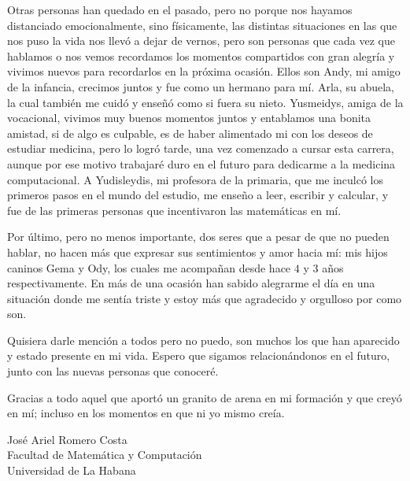 \begin{acknowledgements}
	Otras personas han quedado en el pasado, pero no porque nos hayamos distanciado emocionalmente, sino físicamente, las distintas situaciones en las que nos puso la vida nos llevó a dejar de vernos, pero son personas que cada vez que hablamos o nos vemos recordamos los momentos compartidos con gran alegría y vivimos nuevos para recordarlos en la próxima ocasión. Ellos son Andy, mi amigo de la infancia, crecimos juntos y fue como un hermano para mí. Arla, su abuela, la cual también me cuidó y enseñó como si fuera su nieto. Yusmeidys, amiga de la vocacional, vivimos muy buenos momentos juntos y entablamos una bonita amistad, si de algo es culpable, es de haber alimentado mi  con los deseos de estudiar medicina, pero lo logró tarde, una vez comenzado a cursar esta carrera, aunque por ese motivo trabajaré duro en el futuro para dedicarme a la medicina computacional. A Yudisleydis, mi profesora de la primaria, que me inculcó los primeros pasos en el mundo del estudio, me enseño a leer, escribir y calcular, y fue de las primeras personas que incentivaron las matemáticas en mí.
	
	Por último, pero no menos importante, dos seres que a pesar de que no pueden hablar, no hacen más que expresar sus sentimientos y amor hacia mí: mis hijos caninos Gema y Ody, los cuales me acompañan desde hace $4$ y $3$ años respectivamente. En más de una ocasión han sabido alegrarme el día en una situación donde me sentía triste y estoy más que agradecido y orgulloso por como son.
	
	Quisiera darle mención a todos pero no puedo, son muchos los que han aparecido y estado presente en mi vida. Espero que sigamos relacionándonos en el futuro, junto con las nuevas personas que conoceré.
	
	\begin{phrase}[3in]
		Gracias a todo aquel que aportó un granito de arena en mi formación y que creyó en mí; incluso en los momentos en que ni yo mismo creía.
	\end{phrase}
	
	\begin{flushright}
		José Ariel Romero Costa \\
		Facultad de Matemática y Computación \\
		Universidad de La Habana
	\end{flushright}
\end{acknowledgements}